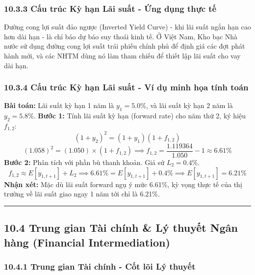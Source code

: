 \documentclass[
]{article}
\begin{document}
\subsubsection{10.3.3 Cấu trúc Kỳ hạn Lãi suất - Ứng dụng thực
tế}\label{cux1ea5u-truxfac-kux1ef3-hux1ea1n-luxe3i-suux1ea5t---ux1ee9ng-dux1ee5ng-thux1ef1c-tux1ebf}

Đường cong lợi suất đảo ngược (Inverted Yield Curve) - khi lãi suất ngắn
hạn cao hơn dài hạn - là chỉ báo dự báo suy thoái kinh tế. Ở Việt Nam,
Kho bạc Nhà nước sử dụng đường cong lợi suất trái phiếu chính phủ để
định giá các đợt phát hành mới, và các NHTM dùng nó làm tham chiếu để
thiết lập lãi suất cho vay dài hạn.

\subsubsection{10.3.4 Cấu trúc Kỳ hạn Lãi suất - Ví dụ minh họa tính
toán}\label{cux1ea5u-truxfac-kux1ef3-hux1ea1n-luxe3i-suux1ea5t---vuxed-dux1ee5-minh-hux1ecda-tuxednh-touxe1n}

\textbf{Bài toán:} Lãi suất kỳ hạn 1 năm là \(y_1 = 5.0\%\), và lãi suất
kỳ hạn 2 năm là \(y_2 = 5.8\%\). \textbf{Bước 1:} Tính lãi suất kỳ hạn
(forward rate) cho năm thứ 2, ký hiệu \(f_{1,2}\):
\[ (1 + y_2)^2 = (1 + y_1)(1 + f_{1,2}) \]
\[ (1.058)^2 = (1.050) \times (1 + f_{1,2}) \implies f_{1,2} = \frac{1.119364}{1.050} - 1 \approx 6.61\% \]
\textbf{Bước 2:} Phân tích với phần bù thanh khoản. Giả sử
\(L_2 = 0.4\%\).
\[ f_{1,2} \approx E[y_{1, t+1}] + L_2 \implies 6.61\% = E[y_{1, t+1}] + 0.4\% \implies E[y_{1, t+1}] = 6.21\% \]
\textbf{Nhận xét:} Mặc dù lãi suất forward ngụ ý mức 6.61\%, kỳ vọng
thực tế của thị trường về lãi suất giao ngay 1 năm tới chỉ là 6.21\%.

\begin{center}\rule{0.5\linewidth}{0.5pt}\end{center}

\subsection{10.4 Trung gian Tài chính \& Lý thuyết Ngân hàng (Financial
Intermediation)}\label{trung-gian-tuxe0i-chuxednh-luxfd-thuyux1ebft-nguxe2n-huxe0ng-financial-intermediation}

\subsubsection{10.4.1 Trung gian Tài chính - Cốt lõi Lý
thuyết}\label{trung-gian-tuxe0i-chuxednh---cux1ed1t-luxf5i-luxfd-thuyux1ebft}
\end{document}
